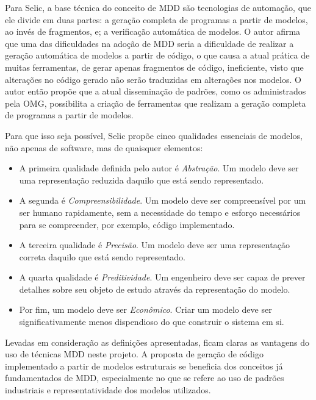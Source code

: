 Para Selic, a base técnica do conceito de MDD são tecnologias de automação, que ele divide em duas partes: a geração completa de programas a partir de modelos, ao invés de fragmentos, e; a verificação automática de modelos. O autor afirma que uma das dificuldades na adoção de MDD seria a dificuldade de realizar a geração automática de modelos a partir de código, o que causa a atual prática de muitas ferramentas, de gerar apenas fragmentos de código, ineficiente, visto que alterações no código gerado não serão traduzidas em alterações nos modelos. O autor então propõe que a atual disseminação de padrões, como os administrados pela OMG, possibilita a criação de ferramentas que realizam a geração completa de programas a partir de modelos.

Para que isso seja possível, Selic propõe cinco qualidades essenciais de modelos, não apenas de software, mas de quaisquer elementos:

\begin{itemize}
    \item A primeira qualidade definida pelo autor é \textit{Abstração}. Um modelo deve ser uma representação reduzida daquilo que está sendo representado.
    \item A segunda é \textit{Compreensibilidade}. Um modelo deve ser compreensível por um ser humano rapidamente, sem a necessidade do tempo e esforço necessários para se compreender, por exemplo, código implementado.
    \item A terceira qualidade é \textit{Precisão}. Um modelo deve ser uma representação correta daquilo que está sendo representado.
    \item A quarta qualidade é \textit{Preditividade}. Um engenheiro deve ser capaz de prever detalhes sobre seu objeto de estudo através da representação do modelo.
    \item Por fim, um modelo deve ser \textit{Econômico}. Criar um modelo deve ser significativamente menos dispendioso do que construir o sistema em si.
\end{itemize}

Levadas em consideração as definições apresentadas, ficam claras as vantagens do uso de técnicas MDD neste projeto. A proposta de geração de código implementado a partir de modelos estruturais se beneficia dos conceitos já fundamentados de MDD, especialmente no que se refere ao uso de padrões industriais e representatividade dos modelos utilizados.


